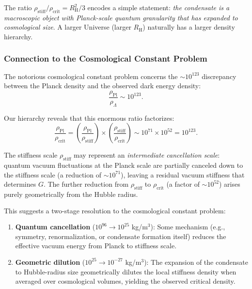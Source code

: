 \documentclass[11pt,a4paper]{article}
\newcommand{\rhocrit}{\rho_{\mathrm{crit}}}
\newcommand{\rhostiff}{\rho_{\mathrm{stiff}}}
\newcommand{\rhoPl}{\rho_{\mathrm{Pl}}}
\newcommand{\RH}{R_{\mathrm{H}}}
\theoremstyle{definition}
\begin{document}
The ratio $\rhostiff/\rhocrit = \RH^2/3$ encodes a simple statement: \emph{the condensate is a macroscopic object with Planck-scale quantum granularity that has expanded to cosmological size}. A larger Universe (larger $\RH$) naturally has a larger density hierarchy.

\subsubsection{Connection to the Cosmological Constant Problem}
\label{sec:cc_problem}

The notorious cosmological constant problem concerns the $\sim 10^{123}$ discrepancy between the Planck density and the observed dark energy density:
\begin{equation}
\label{eq:cc_problem}
\frac{\rhoPl}{\rho_\Lambda} \sim 10^{123}.
\end{equation}

Our hierarchy reveals that this enormous ratio factorizes:
\begin{equation}
\label{eq:hierarchy_factorization}
\frac{\rhoPl}{\rhocrit} = \left(\frac{\rhoPl}{\rhostiff}\right) \times \left(\frac{\rhostiff}{\rhocrit}\right) \sim 10^{71} \times 10^{52} = 10^{123}.
\end{equation}

The stiffness scale $\rhostiff$ may represent an \emph{intermediate cancellation scale}: quantum vacuum fluctuations at the Planck scale are partially canceled down to the stiffness scale (a reduction of $\sim 10^{71}$), leaving a residual vacuum stiffness that determines $G$. The further reduction from $\rhostiff$ to $\rhocrit$ (a factor of $\sim 10^{52}$) arises purely geometrically from the Hubble radius.

This suggests a two-stage resolution to the cosmological constant problem:
\begin{enumerate}[leftmargin=2.2em]
    \item \textbf{Quantum cancellation} ($10^{96} \to 10^{25}$ kg/m$^3$): Some mechanism (e.g., symmetry, renormalization, or condensate formation itself) reduces the effective vacuum energy from Planck to stiffness scale.
    \item \textbf{Geometric dilution} ($10^{25} \to 10^{-27}$ kg/m$^3$): The expansion of the condensate to Hubble-radius size geometrically dilutes the local stiffness density when averaged over cosmological volumes, yielding the observed critical density.
\end{enumerate}
\end{document}
